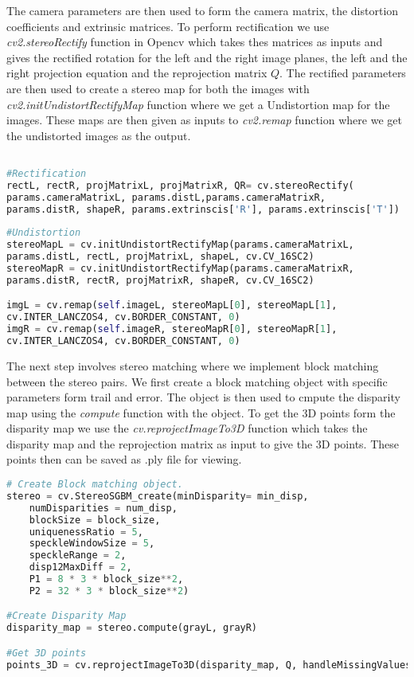 The camera parameters are then used to form the camera matrix, the distortion coefficients and extrinsic matrices. To perform rectification we use \emph{cv2.stereoRectify} function in Opencv which takes thes matrices as inputs and gives the rectified rotation for the left and the right image planes, the left and the right projection equation and the reprojection matrix $Q$. The rectified parameters are then used to create a stereo map for both the images with \emph{cv2.initUndistortRectifyMap} function where we get a Undistortion map for the images. These maps are then given as inputs to \emph{cv2.remap} function where we get the undistorted images as the output.

\begin{lstlisting}[language=python, caption=Rectification and Undistortion]

#Rectification
rectL, rectR, projMatrixL, projMatrixR, QR= cv.stereoRectify(
params.cameraMatrixL, params.distL,params.cameraMatrixR,
params.distR, shapeR, params.extrinscis['R'], params.extrinscis['T'])
	
#Undistortion
stereoMapL = cv.initUndistortRectifyMap(params.cameraMatrixL,
params.distL, rectL, projMatrixL, shapeL, cv.CV_16SC2)
stereoMapR = cv.initUndistortRectifyMap(params.cameraMatrixR,
params.distR, rectR, projMatrixR, shapeR, cv.CV_16SC2)

imgL = cv.remap(self.imageL, stereoMapL[0], stereoMapL[1],
cv.INTER_LANCZOS4, cv.BORDER_CONSTANT, 0)
imgR = cv.remap(self.imageR, stereoMapR[0], stereoMapR[1],
cv.INTER_LANCZOS4, cv.BORDER_CONSTANT, 0)

\end{lstlisting}

The next step involves stereo matching where we implement block matching between the stereo pairs. We first create a block matching object with specific parameters form trail and error. The object is then used to cmpute the disparity map using the \emph{compute} function with the object. To get the 3D points form the disparity map we use the \emph{cv.reprojectImageTo3D} function which takes the disparity map and the reprojection matrix as input to give the 3D points. These points then can be saved as .ply file for viewing.

\begin{lstlisting}[language=python, caption=Disparity Map and Reprojection]
# Create Block matching object. 
stereo = cv.StereoSGBM_create(minDisparity= min_disp,
	numDisparities = num_disp,
	blockSize = block_size,
	uniquenessRatio = 5,
	speckleWindowSize = 5,
	speckleRange = 2,
	disp12MaxDiff = 2,
	P1 = 8 * 3 * block_size**2,
	P2 = 32 * 3 * block_size**2)

#Create Disparity Map
disparity_map = stereo.compute(grayL, grayR)

#Get 3D points
points_3D = cv.reprojectImageTo3D(disparity_map, Q, handleMissingValues=False)

\end{lstlisting}

